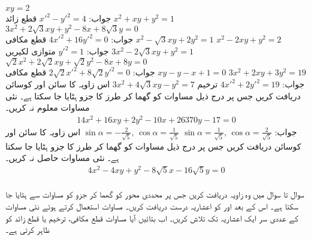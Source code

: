 $xy=2$\\
جواب:\quad
$x'^2-y'^2=4$\quad
قطع زائد
$x^2+xy+y^2=1$
$3x^2+2\sqrt{3}xy+y^2-8x+8\sqrt{3}y=0$\\
جواب:\quad
$4x'^2+16y'^2=0$\quad
قطع مکافی
$x^2-\sqrt{3}xy+2y^2=1$
$x^2-2xy+y^2=2$\\
جواب:\quad
$y'^2=1$\quad
متوازی لکیریں
$3x^2-2\sqrt{3}xy+y^2=1$
$\sqrt{2}x^2+2\sqrt{2}xy+\sqrt{2}y^2-8x+8y=0$\\
جواب:\quad
$2\sqrt{2}x'^2+8\sqrt{2}y'^2=0$\quad
قطع مکافی
$xy-y-x+1=0$
$3x^2+2xy+3y^2=19$\\
جواب:\quad
$4x'^2+2y'^2=19$\quad
ترخیم
$3x^2+4\sqrt{3}xy-y^2=7$
اس زاویہ کا سائن اور کوسائن دریافت کریں جس پر درج ذیل مساوات کو گھما کر  طرز کا جزو ہٹایا جا سکتا ہے۔ نئی مساوات معلوم نہ کریں۔
\begin{align*}
14x^2+16xy+2y^2-10x+26370y-17=0
\end{align*}
جواب:\quad
$\sin\alpha=\tfrac{1}{\sqrt{5}},\,\cos\alpha=\tfrac{2}{\sqrt{5}}$\quad {}\quad
$\sin\alpha=-\tfrac{2}{\sqrt{5}},\, \cos\alpha=\tfrac{1}{\sqrt{5}}$
اس زاویہ کا سائن اور کوسائن دریافت کریں جس پر درج ذیل مساوات کو گھما کر  طرز کا جزو ہٹایا جا سکتا ہے۔ نئی مساوات حاصل نہ کریں۔
\begin{align*}
4x^2-4xy+y^2-8\sqrt{5}x-16\sqrt{5}y=0
\end{align*}
\\
سوال  تا سوال  میں وہ زاویہ  دریافت کریں جس پر محددی محور کو گھما کر جزو   کو مساوات سے ہٹایا جا سکتا ہے۔ اس کے بعد  اور  کو  اعشاریہ درست دریافت کریں۔ مساوات  استعمال کرتے ہوئے نئی مساوات کے عددی سر ایک اعشاریہ تک تلاش کریں۔ اب بتائیں آیا مساوات قطع مکافی، ترخیم یا قطع زائد کو ظاہر کرتی ہے۔

